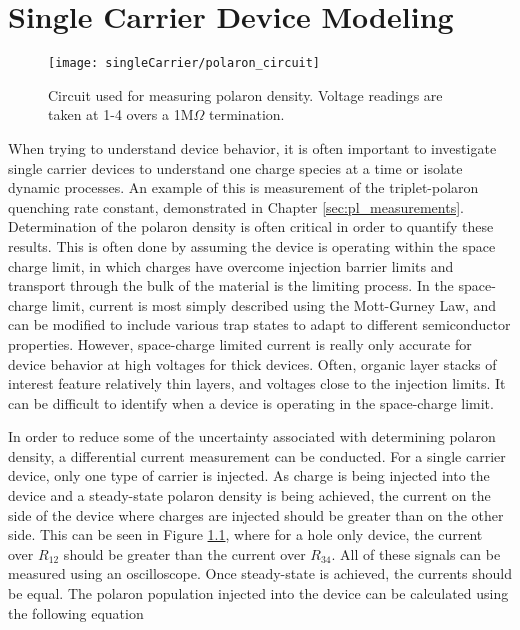 \documentclass[../thesis.tex]{subfiles}
\begin{document}
\chapter{Single Carrier Device Modeling}\label{sec:polaron_density_measurement}


\begin{figure}[ht]
\centering
\texttt{[image: singleCarrier/polaron\_circuit]}
\caption{Circuit used for measuring polaron density.  Voltage readings are taken at 1-4 overs a 1M$\Omega$ termination.}
\label{fig:polaron_circuit}
\end{figure}

When trying to understand device behavior, it is often important to investigate single carrier devices to understand one charge species at a time or isolate dynamic processes.
An example of this is measurement of the triplet-polaron quenching rate constant, demonstrated in Chapter \ref{sec:pl_measurements}.
Determination of the polaron density is often critical in order to quantify these results.
This is often done by assuming the device is operating within the space charge limit, in which charges have overcome injection barrier limits and transport through the bulk of the material is the limiting process.\cite{Reineke2007,Erickson2014}
In the space-charge limit, current is most simply described using the Mott-Gurney Law, and can be modified to include various trap states to adapt to different semiconductor properties.\cite{Pope1999}
However, space-charge limited current is really only accurate for device behavior at high voltages for thick devices.  
Often, organic layer stacks of interest feature relatively thin layers, and voltages close to the injection limits.
It can be difficult to identify when a device is operating in the space-charge limit.

In order to reduce some of the uncertainty associated with determining polaron density, a differential current measurement can be conducted.  
For a single carrier device, only one type of carrier is injected.  
As charge is being injected into the device and a steady-state polaron density is being achieved, the current on the side of the device where charges are injected should be greater than on the other side.
This can be seen in Figure \ref{fig:polaron_circuit}, where for a hole only device, the current over $R_{12}$ should be greater than the current over $R_{34}$.
All of these signals can be measured using an oscilloscope.
Once steady-state is achieved, the currents should be equal.
The polaron population injected into the device can be calculated using the following equation
\end{document}

